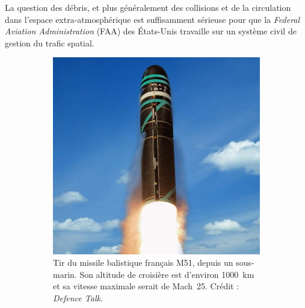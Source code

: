 	La question des débris, et plus généralement des collisions et de la circulation dans l'espace extra-atmosphérique est suffisamment sérieuse pour que la \emph{Federal Aviation Administration} (FAA) des États-Unis travaille sur un système civil de gestion du trafic spatial\footnotemark.
	
	
	\begin{figure}[!htbp]
        \begin{subfigure}[t]{0.41\textwidth}
            \centering
            \includegraphics[width=\textwidth]{figures/ch1/m51}
        	\caption[Missile français M51]{Tir du missile balistique français M51, depuis un sous-marin. Son altitude de croisière est d'environ 1000~km et sa vitesse maximale serait de Mach~25\footnotemark. Crédit : \emph{Defence Talk}\footnotemark.}
            \label{fig:m51}
        \end{subfigure}
        ~
        \begin{subfigure}[t]{0.57\textwidth}
            \centering

\end{subfigure}
\end{figure}
